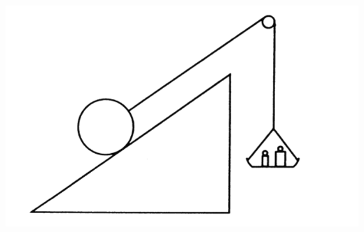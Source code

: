 \documentclass[letterpaper, 10pt, journal]{IEEEtran}
\begin{document}
\includegraphics[scale=0.4]{Galileo1}
\end{document}
